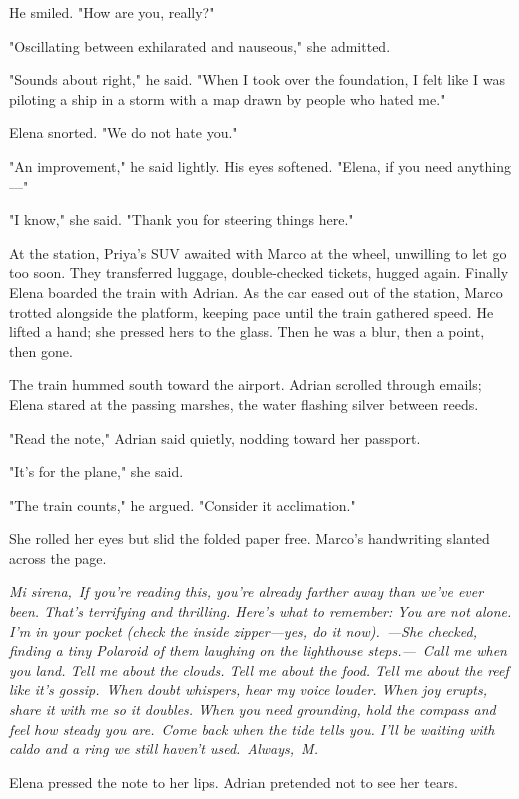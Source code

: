 He smiled. "How are you, really?"

"Oscillating between exhilarated and nauseous," she admitted.

"Sounds about right," he said. "When I took over the foundation, I felt like I was piloting a ship in a storm with a map drawn by people who hated me."

Elena snorted. "We do not hate you."

"An improvement," he said lightly. His eyes softened. "Elena, if you need anything—"

"I know," she said. "Thank you for steering things here."

At the station, Priya's SUV awaited with Marco at the wheel, unwilling to let go too soon. They transferred luggage, double-checked tickets, hugged again. Finally Elena boarded the train with Adrian. As the car eased out of the station, Marco trotted alongside the platform, keeping pace until the train gathered speed. He lifted a hand; she pressed hers to the glass. Then he was a blur, then a point, then gone.

The train hummed south toward the airport. Adrian scrolled through emails; Elena stared at the passing marshes, the water flashing silver between reeds.

"Read the note," Adrian said quietly, nodding toward her passport.

"It's for the plane," she said.

"The train counts," he argued. "Consider it acclimation."

She rolled her eyes but slid the folded paper free. Marco's handwriting slanted across the page.

\textit{Mi sirena,}\
\textit{If you're reading this, you're already farther away than we've ever been. That's terrifying and thrilling. Here's what to remember: You are not alone. I'm in your pocket (check the inside zipper—yes, do it now).}\
\textit{—She checked, finding a tiny Polaroid of them laughing on the lighthouse steps.—}\
\textit{Call me when you land. Tell me about the clouds. Tell me about the food. Tell me about the reef like it's gossip.}\
\textit{When doubt whispers, hear my voice louder. When joy erupts, share it with me so it doubles. When you need grounding, hold the compass and feel how steady you are.}\
\textit{Come back when the tide tells you. I'll be waiting with caldo and a ring we still haven't used.}\
\textit{Always,}\
\textit{M.}

Elena pressed the note to her lips. Adrian pretended not to see her tears.

